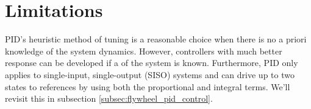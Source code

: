 \section{Limitations}

PID's heuristic method of tuning is a reasonable choice when there is no a
priori knowledge of the \gls{system} dynamics. However, controllers with much
better response can be developed if a  of the
\gls{system} is known. Furthermore, PID only applies to single-input,
single-output (SISO) \glspl{system} and can drive up to two \glspl{state} to
\glspl{reference} by using both the proportional and integral terms. We'll
revisit this in subsection \ref{subsec:flywheel_pid_control}.
